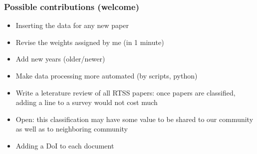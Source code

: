 \documentclass[ignorenonframetext,mathserif]{beamer} %
\begin{document}
\begin{frame}
  \frametitle{Possible contributions (welcome)}
  \begin{itemize}
  \item Inserting the data for any new paper
  \item Revise the weights assigned by me (in 1 minute)
  \item Add new years (older/newer)
  \item Make data processing more automated (by scripts, python)
  \item Write a leterature review of all RTSS papers: once papers are
    classified, adding a line to a survey would not cost much
  \item Open: this classification may have some value to be shared to
    our community as well as to neighboring community
  \item Adding a DoI to each document
  \end{itemize}
\end{frame}
\end{document}
